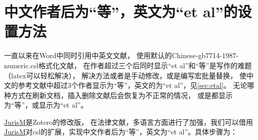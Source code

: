 \documentclass[cn,11pt,chinese]{elegantbook}
\begin{document}
		\section{中文作者后为“等”，英文为“et al”的设置方法}\label{sec:etal_set}	
			一直以来在Word中同时引用中英文文献，
			使用默认的Chinese-gb7714-1987-numeric.csl格式化文献，
			在作者超过三个后同时显示“et al”和“等”是写作的难题（latex可以轻松解决），
			解决方法或者是手动修改，或是编写宏批量替换，
			使中文的参考文献中超过3个作者显示为“等”，英文的为“et al”，见\cref{sec:etal}。
			无论哪种方式在刷新文档，插入删除文献后会恢复为不正常的情况，
			或是都显示为“等”，或显示为“et al”。


			\href{https://juris-m.github.io/release/}{JurisM}是Zotero的修改版，
			在法律文献，多语言方面进行了加强，我们可以借用\href{https://juris-m.github.io/release/}
			{JurisM}对csl的扩展，实现中文作者后为“等”，英文为“et al”。具体步骤为：
\end{document}
